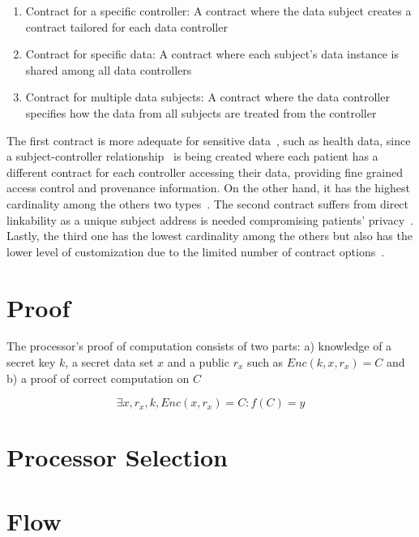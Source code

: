 \begin{enumerate}
  \item Contract for a specific controller: A contract where the data subject creates a contract tailored for each data controller
  \item Contract for specific data: A contract where each subject’s data instance is shared among all data controllers
  \item Contract for multiple data subjects: A contract where the data controller specifies how the data from all subjects are treated from the controller
\end{enumerate}

The first contract is more adequate for sensitive data~\cite{DBLP:journals/corr/NeisseSF17}, such as health data, since a subject-controller relationship~\cite{Azaria2016} is being created where each patient has a different contract for each controller accessing their data, providing fine grained access control and provenance information. On the other hand, it has the highest cardinality among the others two types~\cite{DBLP:journals/corr/NeisseSF17}. The second contract suffers from direct linkability as a unique subject address is needed compromising patients’ privacy~\cite{DBLP:journals/corr/NeisseSF17}. Lastly, the third one has the lowest cardinality among the others but also has the lower level of customization due to the limited number of contract options~\cite{DBLP:journals/corr/NeisseSF17}.

\section{Proof}
\label{solution:proof}

The processor's proof of computation consists of two parts: a) knowledge of a secret key $k$, a secret data set $x$ and a public $r_x$ such as $Enc(k, x, r_x) = C$ and b) a proof of correct computation on $C$

\begin{equation*}
  \exists x, r_x, k, Enc(x, r_x) = C : f(C) = y
\end{equation*}

\section{Processor Selection}
\label{solution:pr_selection}

\section{Flow}
\label{solution:flow}

